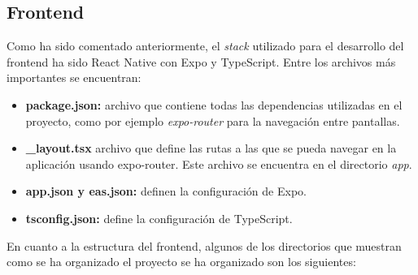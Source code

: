 \subsection{Frontend}

Como ha sido comentado anteriormente, el \textit{stack} utilizado para el desarrollo del frontend ha sido React Native con Expo y TypeScript. Entre los archivos más importantes
se encuentran:

\begin{itemize}
    \item \textbf{package.json:} archivo que contiene todas las dependencias utilizadas en el proyecto, como por ejemplo \textit{expo-router} para la navegación entre pantallas.
    \item \textbf{\_layout.tsx} archivo que define las rutas a las que se pueda navegar en la aplicación usando expo-router. Este archivo se encuentra en el directorio \textit{app}.
    \item \textbf{app.json y eas.json:} definen la configuración de Expo.
    \item \textbf{tsconfig.json:} define la configuración de TypeScript.
\end{itemize}

En cuanto a la estructura del frontend, algunos de los directorios que muestran como se ha organizado el proyecto se ha organizado son los siguientes:

